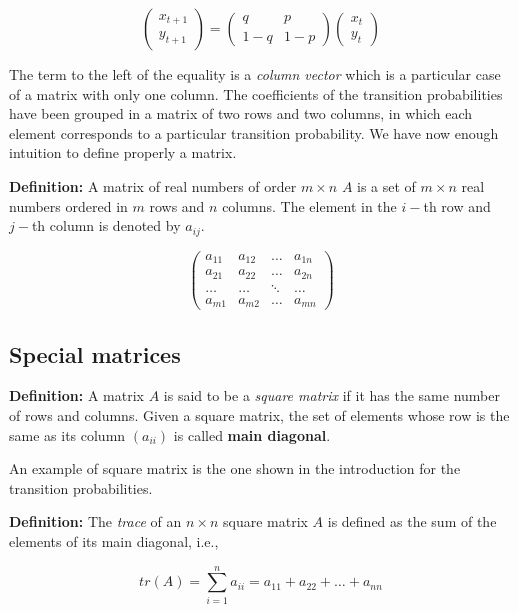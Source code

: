 \documentclass[11pt]{article}
\begin{document}
\[
\begin{pmatrix} x_{t+1} \\ y_{t+1} \end{pmatrix} = \begin{pmatrix} q & p \\ 1-q & 1-p \end{pmatrix}\begin{pmatrix} x_t \\ y_t \end{pmatrix}
\]

The term to the left of the equality is a \emph{column vector} which is
a particular case of a matrix with only one column. The coefficients of
the transition probabilities have been grouped in a matrix of two rows
and two columns, in which each element corresponds to a particular
transition probability. We have now enough intuition to define properly
a matrix.

\textbf{Definition:} A matrix of real numbers of order \(m \times n\)
\(A\) is a set of \(m\times n\) real numbers ordered in \(m\) rows and
\(n\) columns. The element in the \(i-\)th row and \(j-\)th column is
denoted by \(a_{ij}\).

\[
\begin{pmatrix} a_{11} & a_{12} & \ldots & a_{1n} \\ a_{21} & a_{22} & \ldots & a_{2n} \\ \ldots & \ldots & \ddots & \ldots \\ a_{m1} & a_{m2} & \ldots & a_{mn} \end{pmatrix}
\]

\hypertarget{special-matrices}{%
\subsection{Special matrices}\label{special-matrices}}

\textbf{Definition:} A matrix \(A\) is said to be a \emph{square matrix}
if it has the same number of rows and columns. Given a square matrix,
the set of elements whose row is the same as its column \((a_{ii})\) is
called \textbf{main diagonal}.

An example of square matrix is the one shown in the introduction for the
transition probabilities.

\textbf{Definition:} The \emph{trace} of an \(n\times n\) square matrix
\(A\) is defined as the sum of the elements of its main diagonal, i.e.,

\[
tr(A) = \sum^n_{i=1} a_{ii} = a_{11} + a_{22} + \ldots + a_{nn}
\]
\end{document}
